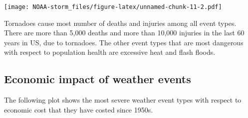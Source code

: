 \documentclass[]{article}
\begin{document}
\texttt{[image: NOAA-storm\_files/figure-latex/unnamed-chunk-11-2.pdf]}

Tornadoes cause most number of deaths and injuries among all event
types. There are more than 5,000 deaths and more than 10,000 injuries in
the last 60 years in US, due to tornadoes. The other event types that
are most dangerous with respect to population health are excessive heat
and flash floods.

\subsection{Economic impact of weather
events}\label{economic-impact-of-weather-events}

The following plot shows the most severe weather event types with
respect to economic cost that they have costed since 1950s.
\end{document}
